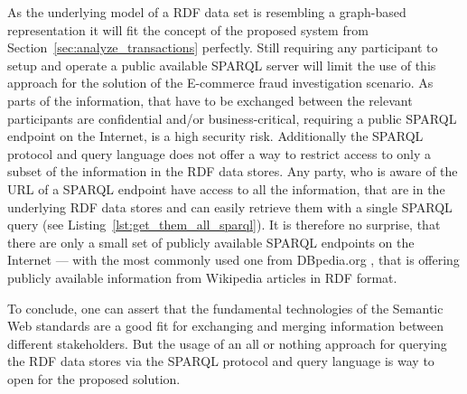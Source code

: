 As the underlying model of a \gls{RDF} data set is resembling a graph-based representation it will fit the concept of the proposed system from Section~\ref{sec:analyze_transactions} perfectly. Still requiring any participant to setup and operate a public available \gls{SPARQL} server will limit the use of this approach for the solution of the \gls{E-commerce} fraud investigation scenario. As parts of the information, that have to be exchanged between the relevant participants are confidential and/or business-critical, requiring a public \gls{SPARQL} endpoint on the Internet, is a high security risk. Additionally the \gls{SPARQL} protocol and query language does not offer a way to restrict access to only a subset of the information in the \gls{RDF} data stores. Any party, who is aware of the \gls{URL} of a \gls{SPARQL} endpoint have access to all the information, that are in the underlying \gls{RDF} data stores and can easily retrieve them with a single \gls{SPARQL} query (see Listing~\ref{lst:get_them_all_sparql}). It is therefore no surprise, that there are only a small set of publicly available \gls{SPARQL} endpoints on the Internet --- with the most commonly used one from DBpedia.org \citep{dbPedia.org}, that is offering publicly available information from Wikipedia articles in \gls{RDF} format. \@


To conclude, one can assert that the fundamental technologies of the Semantic Web standards are a good fit for exchanging and merging information between different stakeholders. But the usage of an all or nothing approach for querying the \gls{RDF} data stores via the \gls{SPARQL} protocol and query language is way to open for the proposed solution.


